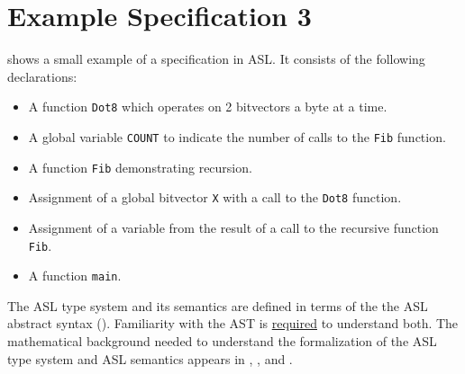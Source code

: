 \begin{center}

\end{center}

\section{Example Specification 3}
 shows a small example of a specification in ASL. It consists of the following declarations:
\begin{itemize}
    \item A function \texttt{Dot8} which operates on 2 bitvectors a byte at a time.
    \item A global variable \texttt{COUNT} to indicate the number of calls to the \texttt{Fib} function.
    \item A function \texttt{Fib} demonstrating recursion.
    \item Assignment of a global bitvector \texttt{X} with a call to the \texttt{Dot8} function.
    \item Assignment of a variable from the result of a call to the recursive function \texttt{Fib}.
    \item A function \texttt{main}.
\end{itemize}

\begin{center}

\end{center}

The ASL type system and its semantics are defined in terms of
the the ASL abstract syntax ().
Familiarity with the AST is \underline{required} to understand both.
The mathematical background needed to understand the formalization
of the ASL type system and ASL semantics appears in ,
, and .

